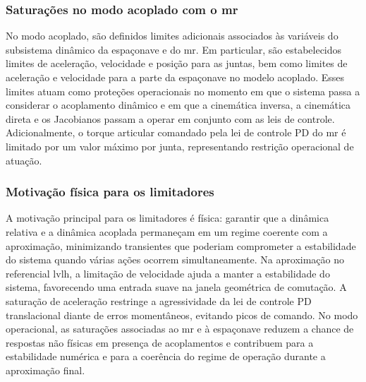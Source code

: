 \subsubsection{Saturações no modo acoplado com o \gls{mr}}
\label{subsubsec_saturacoes_modo_acoplado_mr}

No modo acoplado, são definidos limites adicionais associados às variáveis do subsistema dinâmico da espaçonave e do \gls{mr}.
Em particular, são estabelecidos limites de aceleração, velocidade e posição para as juntas, bem como limites de aceleração e velocidade para a parte da espaçonave no modelo acoplado.
Esses limites atuam como proteções operacionais no momento em que o sistema passa a considerar o acoplamento dinâmico e em que a cinemática inversa, a cinemática direta e os Jacobianos passam a operar em conjunto com as leis de controle.
Adicionalmente, o torque articular comandado pela lei de controle PD do \gls{mr} é limitado por um valor máximo por junta, representando restrição operacional de atuação.

\subsubsection{Motivação física para os limitadores}
\label{subsubsec_motivacao_fisica_limitadores}

A motivação principal para os limitadores é física: garantir que a dinâmica relativa e a dinâmica acoplada permaneçam em um regime coerente com a aproximação, minimizando transientes que poderiam comprometer a estabilidade do sistema quando várias ações ocorrem simultaneamente.
Na aproximação no referencial \gls{lvlh}, a limitação de velocidade ajuda a manter a estabilidade do sistema, favorecendo uma entrada suave na janela geométrica de comutação.
A saturação de aceleração restringe a agressividade da lei de controle PD translacional diante de erros momentâneos, evitando picos de comando.
No modo operacional, as saturações associadas ao \gls{mr} e à espaçonave reduzem a chance de respostas não físicas em presença de acoplamentos e contribuem para a estabilidade numérica e para a coerência do regime de operação durante a aproximação final.